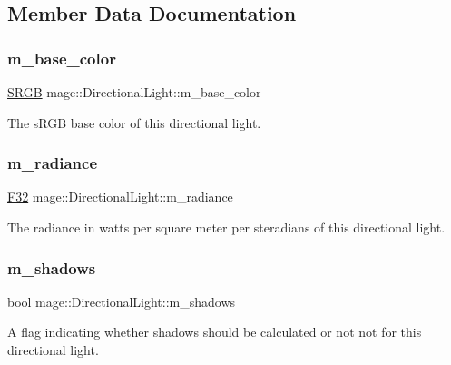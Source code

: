 \subsection{Member Data Documentation}
\hypertarget{classmage_1_1_directional_light_ad482c82fc399192409e24c03de2d2917}{}\label{classmage_1_1_directional_light_ad482c82fc399192409e24c03de2d2917} 
\subsubsection{\texorpdfstring{m\+\_\+base\+\_\+color}{m\_base\_color}}
{\footnotesize\ttfamily \hyperlink{structmage_1_1_s_r_g_b}{S\+R\+GB} mage\+::\+Directional\+Light\+::m\+\_\+base\+\_\+color\hspace{0.3cm}{\ttfamily [private]}}

The s\+R\+GB base color of this directional light. \hypertarget{classmage_1_1_directional_light_aedba48c9e2590284f804ba7cc6225ec3}{}\label{classmage_1_1_directional_light_aedba48c9e2590284f804ba7cc6225ec3} 
\subsubsection{\texorpdfstring{m\+\_\+radiance}{m\_radiance}}
{\footnotesize\ttfamily \hyperlink{namespacemage_aa97e833b45f06d60a0a9c4fc22ae02c0}{F32} mage\+::\+Directional\+Light\+::m\+\_\+radiance\hspace{0.3cm}{\ttfamily [private]}}

The radiance in watts per square meter per steradians of this directional light. \hypertarget{classmage_1_1_directional_light_a607a3dc01ee180f2044fe154c2b73903}{}\label{classmage_1_1_directional_light_a607a3dc01ee180f2044fe154c2b73903} 
\subsubsection{\texorpdfstring{m\+\_\+shadows}{m\_shadows}}
{\footnotesize\ttfamily bool mage\+::\+Directional\+Light\+::m\+\_\+shadows\hspace{0.3cm}{\ttfamily [private]}}

A flag indicating whether shadows should be calculated or not not for this directional light. 